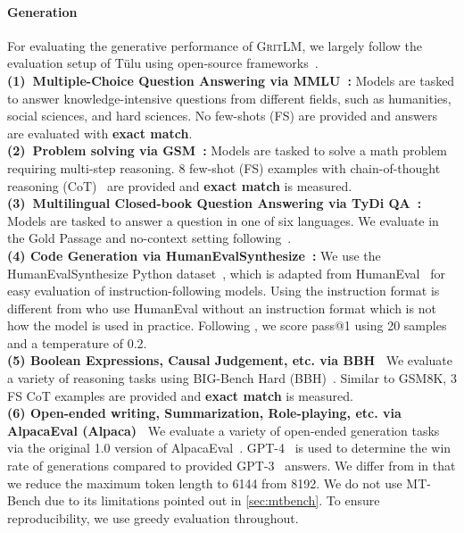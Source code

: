 \documentclass{article}
\newcommand{\model}{\textsc{GritLM}}
\newcommand{\tulu}{T\"ulu}
\begin{document}
\paragraph{Generation} For evaluating the generative performance of \model{}, we largely follow the evaluation setup of \tulu{} \cite{wang2023far,ivison2023camels} using open-source frameworks~\cite{eval-harness, bigcode-evaluation-harness}.\\
\textbf{(1)~Multiple-Choice Question Answering via MMLU~\cite{hendrycks2022unsolved}:} Models are tasked to answer knowledge-intensive questions from different fields, such as humanities, social sciences, and hard sciences. No few-shots (FS) are provided and answers are evaluated with \textbf{exact match}.\\
\textbf{(2)~Problem solving via GSM~\cite{cobbe2021training}:} Models are tasked to solve a math problem requiring multi-step reasoning. 8 few-shot (FS) examples with chain-of-thought reasoning (CoT)~\cite{wei2023chainofthought} are provided and \textbf{exact match} is measured.\\
\textbf{(3)~Multilingual Closed-book Question Answering via TyDi QA~\cite{clark2020tydi}:} Models are tasked to answer a question in one of six languages. We evaluate in the Gold Passage and no-context setting following~\citet{anil2023palm}.\\
\textbf{(4) Code Generation via HumanEvalSynthesize~\cite{muennighoff2023octopack,chen2021evaluating}:} We use the HumanEvalSynthesize Python dataset~\cite{muennighoff2023octopack}, which is adapted from HumanEval~\cite{chen2021evaluating} for easy evaluation of instruction-following models. Using the instruction format is different from \citet{ivison2023camels} who use HumanEval without an instruction format which is not how the model is used in practice. Following \citet{muennighoff2023octopack}, we score pass@1 using 20 samples and a temperature of 0.2.\\
\textbf{(5) Boolean Expressions, Causal Judgement, etc. via BBH~\cite{srivastava2023imitation,suzgun2022challenging}} We evaluate a variety of reasoning tasks using BIG-Bench Hard (BBH)~\cite{srivastava2023imitation,suzgun2022challenging}. Similar to GSM8K, 3 FS CoT examples are provided and \textbf{exact match} is measured.\\
\textbf{(6) Open-ended writing, Summarization, Role-playing, etc. via AlpacaEval (Alpaca)~\cite{alpaca_eval,dubois2023alpacafarm}} We evaluate a variety of open-ended generation tasks via the original 1.0 version of AlpacaEval~\cite{alpaca_eval,dubois2023alpacafarm}. GPT-4~\cite{openai2023gpt4} is used to determine the win rate of generations compared to provided GPT-3~\cite{brown2020language} answers. We differ from \citet{ivison2023camels} in that we reduce the maximum token length to 6144 from 8192. We do not use MT-Bench due to its limitations pointed out in \autoref{sec:mtbench}. To ensure reproducibility, we use greedy evaluation throughout.
\end{document}

